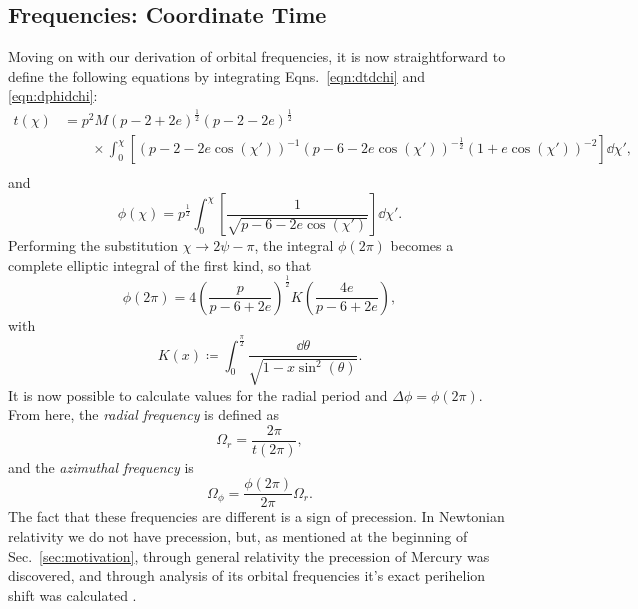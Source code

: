 \subsection{Frequencies: Coordinate Time}
Moving on with our derivation of orbital frequencies, it is now straightforward to define the following equations by integrating Eqns.~\eqref{eqn:dtdchi} and \eqref{eqn:dphidchi}:
\begin{equation}
\begin{split}
t(\chi)&=p^2M(p-2+2e)^{\frac{1}{2}}(p-2-2e)^{\frac{1}{2}}\\
&\qquad\times\int_0^\chi\left[(p-2-2e\cos(\chi'))^{-1}(p-6-2e\cos(\chi'))^{-\frac{1}{2}}(1+e\cos(\chi'))^{-2}\right]\dd{\chi'},\\
\end{split}
\end{equation}
and
\begin{equation}
\phi(\chi)=p^{\frac{1}{2}}\int_0^\chi\left[\frac{1}{\sqrt{p-6-2e\cos(\chi')}}\right]\dd{\chi'}.
\end{equation}
Performing the substitution $\chi \rightarrow 2\psi-\pi$, the integral $\phi(2\pi)$ becomes a complete elliptic integral of the first kind, so that
\begin{equation}
\phi(2\pi)=4\left(\frac{p}{p-6+2e} \right)^{\frac{1}{2}}K\left(\frac{4e}{p-6+2e}\right),
\end{equation}
with
\begin{equation}\label{eqn:ellipticintegral}
    K(x)\coloneqq \int_{0}^{\frac{\pi}{2}}\frac{\dd{\theta}}{\sqrt{1-x\sin^2(\theta)}}.
\end{equation}
It is now possible to calculate values for the radial period and $\Delta\phi=\phi(2\pi)$.
From here, the \textit{radial frequency} is defined as 
\begin{equation}\label{eqn:radfreqdar}
\Omega_r=\frac{2\pi}{t(2\pi)},
\end{equation}
and the \textit{azimuthal frequency} is
\begin{equation}\label{eqn:phifreqdar}
\Omega_\phi=\frac{\phi(2\pi)}{2\pi}\Omega_r.
\end{equation}
The fact that these frequencies are different is a sign of precession.
In Newtonian relativity we do not have precession, but, as mentioned at the beginning of Sec.~\eqref{sec:motivation}, through general relativity the precession of Mercury was discovered, and through analysis of its orbital frequencies it's exact perihelion shift was calculated \cite{mercuryPrecess}.

